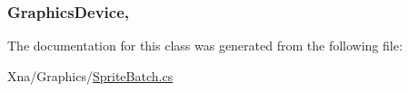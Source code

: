 \subsubsection[{Graphics\+Device}]{ {\bf Graphics\+Device}\hspace{0.3cm}{\ttfamily [get]}, {\ttfamily [set]}}\label{classMicrosoft_1_1Xna_1_1Framework_1_1Graphics_1_1SpriteBatch_a0effcfeca0faa77862cd406f75026efa}


The documentation for this class was generated from the following file\+:\begin{DoxyCompactItemize}
\item 
Xna/\+Graphics/\hyperlink{SpriteBatch_8cs}{Sprite\+Batch.\+cs}\end{DoxyCompactItemize}
